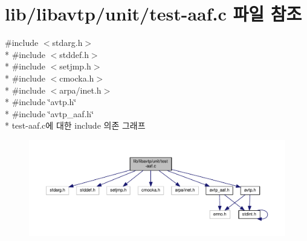 \hypertarget{test-aaf_8c}{}\section{lib/libavtp/unit/test-\/aaf.c 파일 참조}
\label{test-aaf_8c}
{\ttfamily \#include $<$stdarg.\+h$>$}\\*
{\ttfamily \#include $<$stddef.\+h$>$}\\*
{\ttfamily \#include $<$setjmp.\+h$>$}\\*
{\ttfamily \#include $<$cmocka.\+h$>$}\\*
{\ttfamily \#include $<$arpa/inet.\+h$>$}\\*
{\ttfamily \#include \char`\"{}avtp.\+h\char`\"{}}\\*
{\ttfamily \#include \char`\"{}avtp\+\_\+aaf.\+h\char`\"{}}\\*
test-\/aaf.c에 대한 include 의존 그래프
\nopagebreak
\begin{figure}[H]
\begin{center}
\leavevmode
\includegraphics[width=350pt]{test-aaf_8c__incl}
\end{center}
\end{figure}
